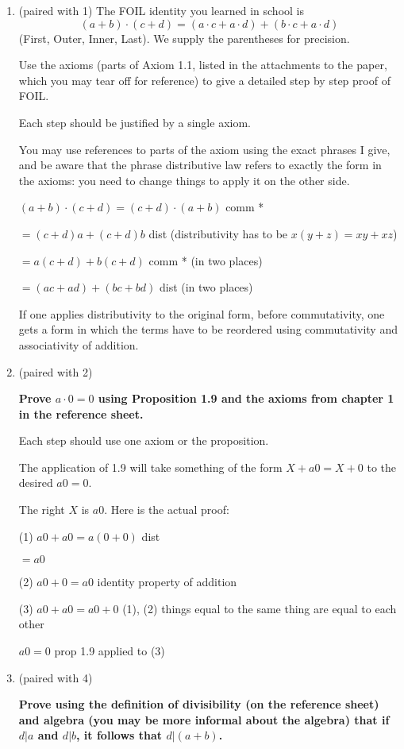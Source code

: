 \documentclass[12pt]{article}
\begin{document}
\begin{enumerate}

\item (paired with 1) The FOIL identity you learned in school is $$(a+b)\cdot(c+d) = (a\cdot c + a \cdot d) + (b \cdot c + a \cdot d)$$ (First, Outer, Inner, Last).  We supply the parentheses for precision.  

Use the axioms (parts of Axiom 1.1, listed in the attachments to the paper, which you may tear off for reference) to give a detailed step by step proof of FOIL.  

Each step should be justified by a single axiom.  

You may use references to parts of the axiom using the exact phrases I give, and be aware that the phrase distributive law refers to exactly the form in the axioms:  you need to change things to apply it on the other side.

$(a+b)\cdot(c+d) = (c+d) \cdot(a+b)$  comm *

$= (c+d)a + (c+d)b$  dist (distributivity has to be $x(y+z) = xy+xz$)

$=a(c+d) + b(c+d)$  comm * (in two places)

$=(ac +ad) + (bc + bd)$  dist (in two places)

If one applies distributivity to the original form, before commutativity, one gets a form in which the terms have to be reordered using commutativity and associativity of addition.



\item  (paired with 2) {\bf Prove $a \cdot 0 = 0$ using Proposition 1.9 and the axioms from chapter 1 in the reference sheet.

Each step should use one axiom or the proposition.

The application of 1.9 will take something of the form $X + a0 = X +0$ to the desired $a0 = 0$.

The right $X$ is $a0$.  Here is the actual proof:

(1) $a0 + a0= a(0+0)$  dist

$=a0$

(2) $a0 + 0 = a0$  identity property of addition

(3)  $a0 + a0 = a0 +0$  (1), (2) things equal to the same thing are equal to each other

$a0 =0$ prop 1.9 applied to (3)}



\item (paired with 4)  {\bf Prove using the definition of divisibility (on the reference sheet) and algebra (you may be more informal about the algebra) that if $d|a$ and $d|b$, it follows that $d|(a+b)$.

}
\end{enumerate}
\end{document}
